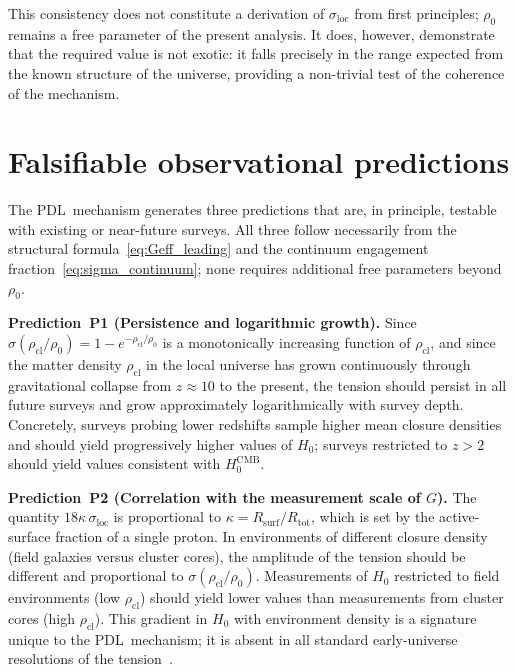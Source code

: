 \documentclass[11pt,a4paper]{article}
\theoremstyle{definition}
\newcommand{\PDL}{\textnormal{PDL}}
\newcommand{\Rsurf}{R_{\mathrm{surf}}}
\newcommand{\Rtot}{R_{\mathrm{tot}}}
\newcommand{\kap}{\kappa}
\newcommand{\sig}{\sigma}
\newcommand{\rhocl}{\rho_{\mathrm{cl}}}
\newcommand{\rhoO}{\rho_0}
\newcommand{\Hzero}{H_0}
\newcommand{\HCMB}{H_0^{\mathrm{CMB}}}
\begin{document}
This consistency does not constitute a derivation of $\sig_{\mathrm{loc}}$ from first principles; $\rhoO$ remains a free parameter of the present analysis. It does, however, demonstrate that the required value is not exotic: it falls precisely in the range expected from the known structure of the universe, providing a non-trivial test of the coherence of the mechanism.

\section{Falsifiable observational predictions}
\label{sec:predictions}

The \PDL\ mechanism generates three predictions that are, in principle, testable with existing or near-future surveys. All three follow necessarily from the structural formula~\eqref{eq:Geff_leading} and the continuum engagement fraction~\eqref{eq:sigma_continuum}; none requires additional free parameters beyond $\rhoO$.

\medskip\noindent\textbf{Prediction~P1 (Persistence and logarithmic growth).} Since $\sig(\rhocl/\rhoO) = 1 - e^{-\rhocl/\rhoO}$ is a monotonically increasing function of $\rhocl$, and since the matter density $\rhocl$ in the local universe has grown continuously through gravitational collapse from $z \approx 10$ to the present, the tension should persist in all future surveys and grow approximately logarithmically with survey depth. Concretely, surveys probing lower redshifts sample higher mean closure densities and should yield progressively higher values of $\Hzero$; surveys restricted to $z > 2$ should yield values consistent with $\HCMB$.

\medskip\noindent\textbf{Prediction~P2 (Correlation with the measurement scale of $G$).} The quantity $18\kap\,\sig_{\mathrm{loc}}$ is proportional to $\kap = \Rsurf/\Rtot$, which is set by the active-surface fraction of a single proton. In environments of different closure density (field galaxies versus cluster cores), the amplitude of the tension should be different and proportional to $\sig(\rhocl/\rhoO)$. Measurements of $\Hzero$ restricted to field environments (low $\rhocl$) should yield lower values than measurements from cluster cores (high $\rhocl$). This gradient in $\Hzero$ with environment density is a signature unique to the \PDL\ mechanism; it is absent in all standard early-universe resolutions of the tension~\cite{Verde_2019}.
\end{document}
